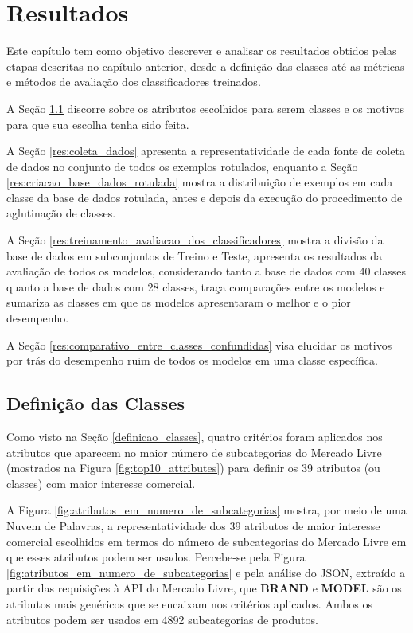 \chapter[Resultados]{Resultados}
\label{cap-resultados}
Este capítulo tem como objetivo descrever e analisar os resultados obtidos pelas etapas descritas no capítulo anterior, desde a definição das classes até as métricas e métodos de avaliação dos classificadores treinados.

A Seção \ref{res:definicao_classes} discorre sobre os atributos escolhidos para serem classes e os motivos para que sua escolha tenha sido feita.

A Seção \ref{res:coleta_dados} apresenta a representatividade de cada fonte de coleta de dados no conjunto de todos os exemplos rotulados, enquanto a Seção \ref{res:criacao_base_dados_rotulada} mostra a distribuição de exemplos em cada classe da base de dados rotulada, antes e depois da execução do procedimento de aglutinação de classes.

A Seção \ref{res:treinamento_avaliacao_dos_classificadores} mostra a divisão da base de dados em subconjuntos de Treino e Teste, apresenta os resultados da avaliação de todos os modelos, considerando tanto a base de dados com 40 classes quanto a base de dados com 28 classes, traça comparações entre os modelos e sumariza as classes em que os modelos apresentaram o melhor e o pior desempenho.

A Seção \ref{res:comparativo_entre_classes_confundidas} visa elucidar os motivos por trás do desempenho ruim de todos os modelos em uma classe específica.

\section{Definição das Classes}
\label{res:definicao_classes}
Como visto na Seção \ref{definicao_classes}, quatro critérios foram aplicados nos atributos que aparecem no maior número de subcategorias do Mercado Livre (mostrados na Figura \ref{fig:top10_attributes}) para definir os 39 atributos (ou classes) com maior interesse comercial.

A Figura \ref{fig:atributos_em_numero_de_subcategorias} mostra, por meio de uma Nuvem de Palavras, a representatividade dos 39 atributos de maior interesse comercial escolhidos em termos do número de subcategorias do Mercado Livre em que esses atributos podem ser usados. Percebe-se pela Figura \ref{fig:atributos_em_numero_de_subcategorias} e pela análise do JSON, extraído a partir das requisições à API do Mercado Livre, que \textbf{BRAND} e \textbf{MODEL} são os atributos mais genéricos que se encaixam nos critérios aplicados. Ambos os atributos podem ser usados em 4892 subcategorias de produtos.


